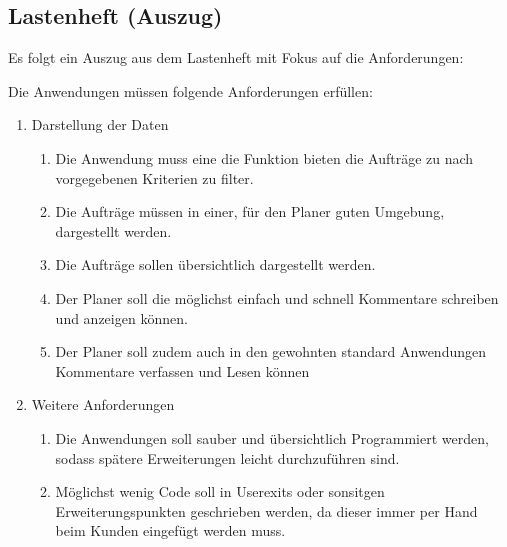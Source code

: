 \subsection{Lastenheft (Auszug)}
\label{app:Lastenheft}
Es folgt ein Auszug aus dem Lastenheft mit Fokus auf die Anforderungen:

Die Anwendungen müssen folgende Anforderungen erfüllen: 
\begin{enumerate}[itemsep=0em,partopsep=0em,parsep=0em,topsep=0em]
\item Darstellung der Daten
	\begin{enumerate}
	\item Die Anwendung muss eine die Funktion bieten die Aufträge zu nach vorgegebenen Kriterien zu filter.
	\item Die Aufträge müssen in einer, für den Planer guten Umgebung, dargestellt werden.
	\item Die Aufträge sollen übersichtlich dargestellt werden. 
	\item Der Planer soll die möglichst einfach und schnell Kommentare schreiben und anzeigen können. 
	\item Der Planer soll zudem auch in den gewohnten standard Anwendungen Kommentare verfassen und Lesen können 
	\end{enumerate}
\item Weitere Anforderungen
	\begin{enumerate}
	\item Die Anwendungen soll sauber und übersichtlich Programmiert werden, sodass spätere Erweiterungen leicht durchzuführen sind.
	\item Möglichst wenig Code soll in Userexits oder sonsitgen Erweiterungspunkten geschrieben werden, da dieser immer per Hand beim Kunden eingefügt werden muss.
	\end{enumerate}
\end{enumerate}

